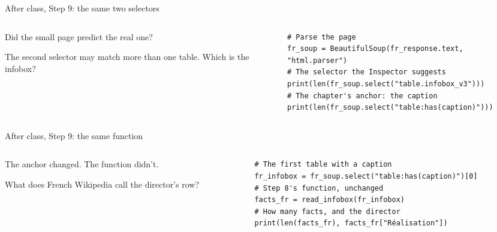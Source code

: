 \documentclass[9pt,aspectratio=169]{beamer}
\begin{document}
\begin{frame}[fragile]{After class, Step 9: the same two selectors}
    \begin{columns}[T]
        \begin{column}{0.37\textwidth}
            Did the small page predict the real one?

            \medskip
            The second selector may match more than one table. Which is the infobox?
        \end{column}
        \begin{column}{0.6\textwidth}
\begin{lstlisting}
# Parse the page
fr_soup = BeautifulSoup(fr_response.text, "html.parser")
# The selector the Inspector suggests
print(len(fr_soup.select("table.infobox_v3")))
# The chapter's anchor: the caption
print(len(fr_soup.select("table:has(caption)")))
\end{lstlisting}
        \end{column}
    \end{columns}
\end{frame}

\begin{frame}[fragile]{After class, Step 9: the same function}
    \begin{columns}[T]
        \begin{column}{0.37\textwidth}
            The anchor changed. The function didn't.

            \medskip
            What does French Wikipedia call the director's row?
        \end{column}
        \begin{column}{0.6\textwidth}
\begin{lstlisting}
# The first table with a caption
fr_infobox = fr_soup.select("table:has(caption)")[0]
# Step 8's function, unchanged
facts_fr = read_infobox(fr_infobox)
# How many facts, and the director
print(len(facts_fr), facts_fr["Réalisation"])
\end{lstlisting}
        \end{column}
    \end{columns}
\end{frame}
\end{document}

